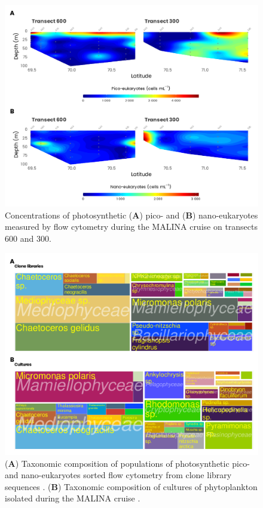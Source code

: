 \documentclass[essd, manuscript]{copernicus}
\begin{document}
\clearpage

\begin{figure}[H]
    \centering
    \includegraphics[scale = 1]{../../../graphs/fig10.pdf}
    \caption{Concentrations of photosynthetic (\textbf{A}) pico- and (\textbf{B}) nano-eukaryotes measured by flow cytometry during the MALINA cruise on transects 600 and 300.}
\end{figure}

\clearpage

\begin{figure}[H]
    \centering
    \includegraphics[scale = 1]{../../../graphs/fig11.pdf}
    \caption{(\textbf{A}) Taxonomic composition of populations of photosynthetic pico- and nano-eukaryotes sorted flow cytometry from clone library sequences  \citep{Balzano2012a}. (\textbf{B}) Taxonomic composition of cultures of phytoplankton isolated during the MALINA cruise \citep{Balzano2012b}.}
\end{figure}
\end{document}
